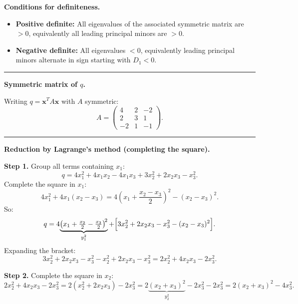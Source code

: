 \documentclass[12pt,a3paper]{article}
\begin{document}
\begin{tcolorbox}[enhanced,breakable,
  colback=cE!4,colframe=cE,boxrule=0.8pt,arc=5pt,
  title={\textbf{Answer --- Canonical Form of $q = 4x_1^2+3x_2^2-x_3^2+4x_1x_2-4x_1x_3+2x_2x_3$}},
  fonttitle=\bfseries\color{white},colbacktitle=cE]
 
\textbf{Conditions for definiteness.}
\begin{itemize}[itemsep=2pt]
  \item \textbf{Positive definite:} All eigenvalues of the associated symmetric matrix
        are $> 0$, equivalently all leading principal minors are $> 0$.
  \item \textbf{Negative definite:} All eigenvalues $< 0$, equivalently leading
        principal minors alternate in sign starting with $D_1 < 0$.
\end{itemize}
 
\medskip\textcolor{cE}{\rule{\textwidth}{0.4pt}}
 
\textbf{Symmetric matrix of $q$.}
 
Writing $q = \mathbf{x}^T A \mathbf{x}$ with $A$ symmetric:
\[
  A = \begin{pmatrix}4 & 2 & -2\\2 & 3 & 1\\-2 & 1 & -1\end{pmatrix}.
\]
 
\medskip\textcolor{cE}{\rule{\textwidth}{0.4pt}}
 
\textbf{Reduction by Lagrange's method (completing the square).}
 
\textbf{Step 1.} Group all terms containing $x_1$:
\[
  q = 4x_1^2 + 4x_1 x_2 - 4x_1 x_3 + 3x_2^2 + 2x_2 x_3 - x_3^2.
\]
Complete the square in $x_1$:
\[
  4x_1^2 + 4x_1(x_2 - x_3)
  = 4\!\left(x_1 + \frac{x_2-x_3}{2}\right)^{\!2} - (x_2 - x_3)^2.
\]
So:
\[
  q = 4\!\underbrace{\left(x_1 + \tfrac{x_2}{2} - \tfrac{x_3}{2}\right)^{\!2}}_{y_1^2}
      + \Bigl[3x_2^2 + 2x_2x_3 - x_3^2 - (x_2-x_3)^2\Bigr].
\]
Expanding the bracket:
\[
  3x_2^2 + 2x_2x_3 - x_3^2 - x_2^2 + 2x_2x_3 - x_3^2
  = 2x_2^2 + 4x_2x_3 - 2x_3^2.
\]
 
\textbf{Step 2.} Complete the square in $x_2$:
\[
  2x_2^2 + 4x_2 x_3 - 2x_3^2
  = 2(x_2^2 + 2x_2 x_3) - 2x_3^2
  = 2\!\underbrace{(x_2 + x_3)^2}_{y_2^2} - 2x_3^2 - 2x_3^2
  = 2(x_2 + x_3)^2 - 4x_3^2.
\]
 

\end{tcolorbox}
\end{document}
